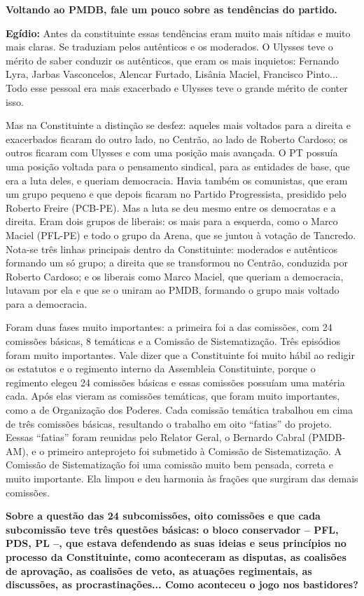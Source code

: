 \textbf{Voltando ao PMDB, fale um pouco sobre as tendências do partido.}

\textbf{Egídio:} Antes da constituinte essas tendências eram muito mais
nítidas e muito mais claras. Se traduziam pelos autênticos e os
moderados. O Ulysses teve o mérito de saber conduzir os autênticos, que
eram os mais inquietos: Fernando Lyra, Jarbas Vasconcelos, Alencar
Furtado, Lisânia Maciel, Francisco Pinto... Todo esse pessoal era mais
exacerbado e Ulysses teve o grande mérito de conter isso.

Mas na Constituinte a distinção se desfez: aqueles mais voltados para a
direita e exacerbados ficaram do outro lado, no Centrão, ao lado de
Roberto Cardoso; os outros ficaram com Ulysses e com uma posição mais
avançada. O PT possuía uma posição voltada para o pensamento sindical,
para as entidades de base, que era a luta deles, e queriam democracia.
Havia também os comunistas, que eram um grupo pequeno e que depois
ficaram no Partido Progressista, presidido pelo Roberto Freire (PCB-PE).
Mas a luta se deu mesmo entre os democratas e a direita. Eram dois
grupos de liberais: os mais para a esquerda, como o Marco Maciel
(PFL-PE) e todo o grupo da Arena, que se juntou à votação de Tancredo.
Nota-se três linhas principais dentro da Constituinte: moderados e
autênticos formando um só grupo; a direita que se transformou no
Centrão, conduzida por Roberto Cardoso; e os liberais como Marco Maciel,
que queriam a democracia, lutavam por ela e que se o uniram ao PMDB,
formando o grupo mais voltado para a democracia.

Foram duas fases muito importantes: a primeira foi a das comissões, com
24 comissões básicas, 8 temáticas e a Comissão de Sistematização. Três
episódios foram muito importantes. Vale dizer que a Constituinte foi
muito hábil ao redigir os estatutos e o regimento interno da Assembleia
Constituinte, porque o regimento elegeu 24 comissões básicas e essas
comissões possuíam uma matéria cada. Após elas vieram as comissões
temáticas, que foram muito importantes, como a de Organização dos
Poderes. Cada comissão temática trabalhou em cima de três comissões
básicas, resultando o trabalho em oito ``fatias'' do projeto. Eessas
``fatias'' foram reunidas pelo Relator Geral, o Bernardo Cabral
(PMDB-AM), e o primeiro anteprojeto foi submetido à Comissão de
Sistematização. A Comissão de Sistematização foi uma comissão muito bem
pensada, correta e muito importante. Ela limpou e deu harmonia às
frações que surgiram das demais comissões.

\textbf{Sobre a questão das 24 subcomissões, oito comissões e que cada
subcomissão teve três questões básicas: o bloco conservador -- PFL, PDS,
PL --, que estava defendendo as suas ideias e seus princípios no
processo da Constituinte, como aconteceram as disputas, as coalisões de
aprovação, as coalisões de veto, as atuações regimentais, as discussões,
as procrastinações... Como aconteceu o jogo nos bastidores?}


